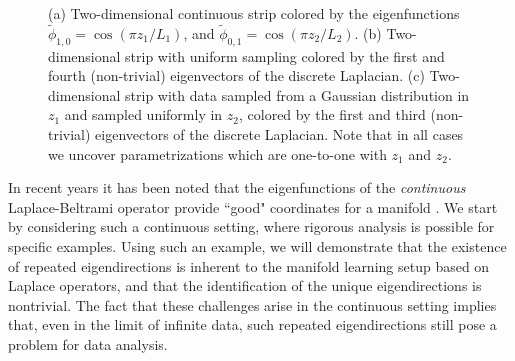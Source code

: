 \documentclass[3p]{elsarticle}
\begin{document}
\begin{figure}[t]
\begin{subfigure}{0.3\textwidth}
\caption{}
\label{subfig:strip_evecs_nonuniform}
\end{subfigure}
%
\caption{(a) Two-dimensional continuous strip colored by the eigenfunctions $\tilde{\phi}_{1, 0} = \cos \left( {\pi z_1}/{L_1} \right)$, and $\tilde{\phi}_{0, 1} = \cos \left( {\pi z_2}/{L_2} \right)$. (b) Two-dimensional strip with uniform sampling colored by the first and fourth (non-trivial) eigenvectors of the discrete Laplacian. (c) Two-dimensional strip with data sampled from a Gaussian distribution in $z_1$ and sampled uniformly in $z_2$, colored by the first and third (non-trivial) eigenvectors of the discrete Laplacian. Note that in all cases we uncover parametrizations which are one-to-one with $z_1$ and $z_2$.}
\end{figure}

In recent years it has been noted that the eigenfunctions of the \emph{continuous}
Laplace-Beltrami operator provide ``good" coordinates for a manifold \cite{jones2008}.
%
We start by considering such a continuous setting, where rigorous analysis is possible for specific examples.
%
Using such an example, we will demonstrate that the existence of repeated eigendirections is
inherent to the manifold learning setup based on Laplace operators,
and that the identification of the unique eigendirections is nontrivial.
%
The fact that these challenges arise in the continuous setting implies that, even in the limit of infinite data, such repeated eigendirections still pose a problem for data analysis.
\end{document}
